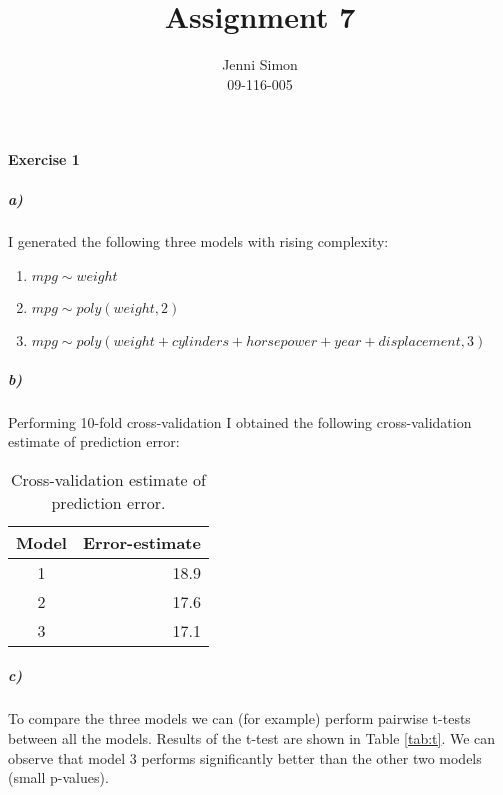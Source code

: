\documentclass{paper}
\title{Assignment 7}
\author{Jenni Simon\\09-116-005}
\begin{document}
\maketitle


%


\paragraph{Exercise 1}

\subparagraph{a)}
I generated the following three models with rising complexity:
\begin{enumerate}
	\item{$mpg \sim weight$}
	\item{$mpg \sim poly(weight, 2)$}
	\item{$mpg \sim poly(weight+cylinders+horsepower+year+displacement, 3)$}
\end{enumerate}

\subparagraph{b)}
Performing 10-fold cross-validation I obtained the following cross-validation estimate of prediction error:

\begin{table}[!h]
\centering
\caption{Cross-validation estimate of prediction error.}
\begin{tabular}{|c|r|}
\hline
\textbf{Model} & \multicolumn{1}{c|}{\textbf{Error-estimate}} \\ \hline
1              & 18.9                                                    \\ 
2              & 17.6                                                    \\ 
3              & 17.1                                                    \\ \hline
\end{tabular}
\end{table}


\subparagraph{c)}

To compare the three models we can (for example) perform pairwise t-tests between all the models. Results of the t-test are shown in Table \ref{tab:t}. 
We can observe that model 3 performs significantly better than the other two models (small p-values).
\end{document}
